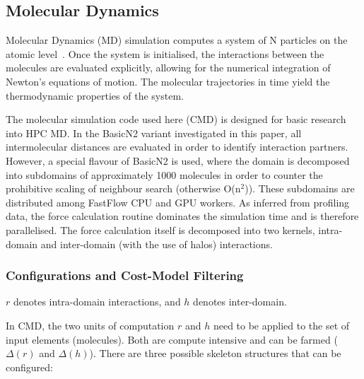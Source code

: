 \documentclass[smallextended]{svjour3}
\begin{document}
\subsection{Molecular Dynamics}

Molecular Dynamics (MD) simulation computes a system of N particles on the atomic level~\cite{allen2004introduction}. Once the system is initialised, the interactions between the molecules are evaluated explicitly, allowing for the numerical integration of Newton's equations of motion. The molecular trajectories in time yield the thermodynamic properties of the system.

The molecular simulation code used here (CMD) is designed for basic research into HPC MD. 
In the BasicN2 variant investigated in this paper, all intermolecular distances are evaluated in order to identify interaction partners.  However, a special flavour of BasicN2 is used, where the domain is decomposed into subdomains of approximately 1000 molecules in order to counter the prohibitive scaling of neighbour search (otherwise O(n$^2$)). These subdomains are distributed among FastFlow CPU and GPU workers. As inferred from profiling data, the force calculation routine dominates the simulation time and is therefore parallelised. The force calculation itself is decomposed into two kernels, intra-domain and inter-domain (with the use of halos) interactions. 

\subsubsection{Configurations and Cost-Model Filtering}
$r$ denotes intra-domain interactions, and $h$ denotes inter-domain. %


In CMD, the two units of computation $r$ and $h$ need to be applied to the set of input elements (molecules). Both are compute intensive and can be farmed ($\Delta(r)$ and $\Delta(h)$). There are three possible skeleton structures that can be configured:
\end{document}
